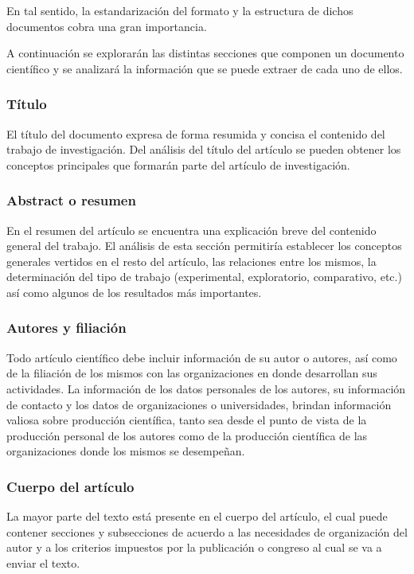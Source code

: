 En tal sentido, la estandarización del formato y la estructura de dichos documentos cobra una gran importancia.

A continuación se explorarán las distintas secciones que componen un documento científico y se analizará la información que se puede extraer de cada uno de ellos.

\subsubsection{Título}

El título del documento expresa de forma resumida y concisa el contenido del trabajo de investigación. Del análisis del título del artículo se pueden obtener los conceptos principales que formarán parte del artículo de investigación.

\subsubsection{Abstract o resumen}

En el resumen del artículo se encuentra una explicación breve del contenido general del trabajo. El análisis de esta sección permitiría establecer los conceptos generales vertidos en el resto del artículo, las relaciones entre los mismos, la determinación del tipo de trabajo (experimental, exploratorio, comparativo, etc.) así como algunos de los resultados más importantes.

\subsubsection{Autores y filiación}

Todo artículo científico debe incluir información de su autor o autores, así como de la filiación de los mismos con las organizaciones en donde desarrollan sus actividades. La información de los datos personales de los autores, su información de contacto y los datos de organizaciones o universidades, brindan información valiosa sobre producción científica, tanto sea desde el punto de vista de la producción personal de los autores como de la producción científica de las organizaciones donde los mismos se desempeñan.

\subsubsection{Cuerpo del artículo}

La mayor parte del texto está presente en el cuerpo del artículo, el cual puede contener secciones y subsecciones de acuerdo a las necesidades de organización del autor y a los criterios impuestos por la publicación o congreso al cual se va a enviar el texto.

